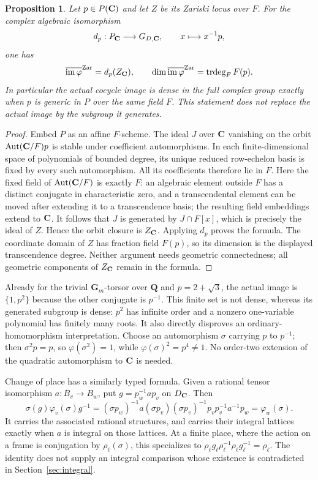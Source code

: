 \documentclass[11pt]{article}
\newtheorem{proposition}[theorem]{Proposition}
\theoremstyle{definition}\newtheorem{definition}[theorem]{Definition}
\theoremstyle{remark}\newtheorem{remark}[theorem]{Remark}
\newcommand{\Q}{\mathbf Q}\newcommand{\Z}{\mathbf Z}
\newcommand{\Gm}{\mathbf G_m}\newcommand{\B}{\mathrm B}\newcommand{\dR}{\mathrm{dR}}
\DeclareMathOperator{\Aut}{Aut}\DeclareMathOperator{\Isom}{Isom}
\begin{document}
\begin{proposition}\label{prop:orbit-closure}
Let $p\in P(\mathbf C)$ and let $Z$ be its Zariski locus over $F$. For the complex algebraic isomorphism
\[
 d_p:P_\mathbf C\longrightarrow G_{D,\mathbf C},\qquad x\longmapsto x^{-1}p,
\]
one has
\[
 \overline{\operatorname{im}\varphi}^{\rm Zar}=d_p(Z_\mathbf C),\qquad
 \dim\overline{\operatorname{im}\varphi}^{\rm Zar}=\operatorname{trdeg}_F F(p).
\]
In particular the actual cocycle image is dense in the full complex group exactly when $p$ is generic in $P$ over the same field $F$. This statement does not replace the actual image by the subgroup it generates.
\end{proposition}
\begin{proof}
Embed $P$ as an affine $F$-scheme. The ideal $J$ over $\mathbf C$ vanishing on the orbit $\Aut(\C/F)p$ is stable under coefficient automorphisms. In each finite-dimensional space of polynomials of bounded degree, its unique reduced row-echelon basis is fixed by every such automorphism. All its coefficients therefore lie in $F$. Here the fixed field of $\Aut(\C/F)$ is exactly $F$: an algebraic element outside $F$ has a distinct conjugate in characteristic zero, and a transcendental element can be moved after extending it to a transcendence basis; the resulting field embeddings extend to $\mathbf C$. It follows that $J$ is generated by $J\cap F[x]$, which is precisely the ideal of $Z$. Hence the orbit closure is $Z_\mathbf C$. Applying $d_p$ proves the formula. The coordinate domain of $Z$ has fraction field $F(p)$, so its dimension is the displayed transcendence degree. Neither argument needs geometric connectedness; all geometric components of $Z_\mathbf C$ remain in the formula.
\end{proof}

Already for the trivial $\Gm$-torsor over $\Q$ and $p=2+\sqrt3$, the actual image is $\{1,p^2\}$ because the other conjugate is $p^{-1}$. This finite set is not dense, whereas its generated subgroup is dense: $p^2$ has infinite order and a nonzero one-variable polynomial has finitely many roots. It also directly disproves an ordinary-homomorphism interpretation. Choose an automorphism $\sigma$ carrying $p$ to $p^{-1}$; then $\sigma^2p=p$, so $\varphi(\sigma^2)=1$, while $\varphi(\sigma)^2=p^4\ne1$. No order-two extension of the quadratic automorphism to $\mathbf C$ is needed.

Change of place has a similarly typed formula. Given a rational tensor isomorphism $a:B_v\to B_w$, put $g=p_w^{-1}ap_v$ on $D_\mathbf C$. Then
\[
 \sigma(g)\varphi_v(\sigma)g^{-1}
 = (\sigma p_w)^{-1}a(\sigma p_v)
   (\sigma p_v)^{-1}p_vp_v^{-1}a^{-1}p_w
 =\varphi_w(\sigma).
\]
It carries the associated rational structures, and carries their integral lattices exactly when $a$ is integral on those lattices. At a finite place, where the action on a frame is conjugation by $\rho_\ell(\sigma)$, this specializes to
$\rho_\ell g_\ell\rho_\ell^{-1}\rho_\ell g_\ell^{-1}=\rho_\ell$. The identity does not supply an integral comparison whose existence is contradicted in Section~\ref{sec:integral}.
\end{document}
